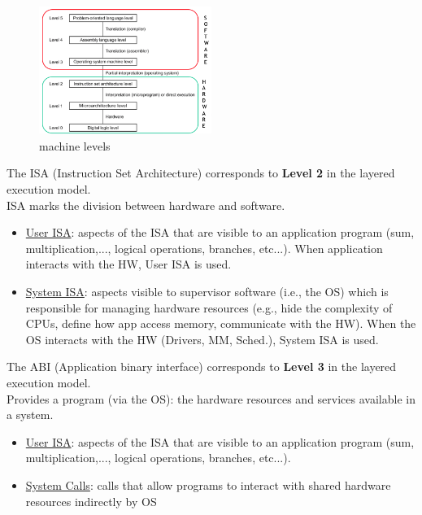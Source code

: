 \documentclass[10pt, oneside]{article}
\begin{document}
\begin{multicols}{2}
    \begin{figure}[H]
        \begin{center}
        \includegraphics[width=0.5\textwidth]{img/img31.png}
        \caption{machine levels}
        \label{fig:machine levels}
        \end{center}
    \end{figure}
    \columnbreak
The ISA (Instruction Set Architecture) corresponds to {\bf Level 2} in the layered execution model. \\ISA marks the division between hardware and software.
    \begin{itemize}
        \item \underline{User ISA}: aspects of the ISA that are visible to an application program (sum, multiplication,..., logical operations, branches, etc...). When application interacts with the HW, User ISA is used.
        \item \underline{System ISA}: aspects visible to supervisor software (i.e., the OS) which is responsible for managing hardware resources (e.g., hide the complexity of CPUs, define how app access memory, communicate with the HW). When the OS interacts with the HW (Drivers, MM, Sched.), System ISA is used.
    \end{itemize}
The ABI (Application binary interface) corresponds to {\bf Level 3} in the layered execution model.\\ Provides a program (via the OS): the hardware resources and services available in a
system.
    \begin{itemize}
        \item \underline{User ISA}: aspects of the ISA that are visible to an application program (sum, multiplication,..., logical operations, branches, etc...).
        \item \underline{System Calls}: calls that allow programs to interact with shared hardware resources indirectly by OS
    \end{itemize}
\end{multicols}
\end{document}
